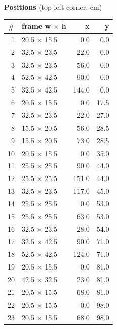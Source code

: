 \documentclass[a4paper,landscape,10pt]{article}
\begin{document}
\begin{minipage}[t]{0.25\textwidth}
\vspace{8pt}
{\bfseries Positions} (top-left corner, cm)\\[2pt]
\tiny
\begin{tabular}{@{}r l r r@{}}
\toprule
\# & frame w $\times$ h & x & y \\
\midrule
1 & 20.5 $\times$ 15.5 & 0.0 & 0.0 \\
2 & 32.5 $\times$ 23.5 & 22.0 & 0.0 \\
3 & 32.5 $\times$ 23.5 & 56.0 & 0.0 \\
4 & 52.5 $\times$ 42.5 & 90.0 & 0.0 \\
5 & 32.5 $\times$ 42.5 & 144.0 & 0.0 \\
6 & 20.5 $\times$ 15.5 & 0.0 & 17.5 \\
7 & 32.5 $\times$ 23.5 & 22.0 & 27.0 \\
8 & 15.5 $\times$ 20.5 & 56.0 & 28.5 \\
9 & 15.5 $\times$ 20.5 & 73.0 & 28.5 \\
10 & 20.5 $\times$ 15.5 & 0.0 & 35.0 \\
11 & 25.5 $\times$ 25.5 & 90.0 & 44.0 \\
12 & 25.5 $\times$ 25.5 & 151.0 & 44.0 \\
13 & 32.5 $\times$ 23.5 & 117.0 & 45.0 \\
14 & 25.5 $\times$ 25.5 & 0.0 & 53.0 \\
15 & 25.5 $\times$ 25.5 & 63.0 & 53.0 \\
16 & 32.5 $\times$ 23.5 & 28.0 & 54.0 \\
17 & 32.5 $\times$ 42.5 & 90.0 & 71.0 \\
18 & 52.5 $\times$ 42.5 & 124.0 & 71.0 \\
19 & 20.5 $\times$ 15.5 & 0.0 & 81.0 \\
20 & 42.5 $\times$ 32.5 & 23.0 & 81.0 \\
21 & 20.5 $\times$ 15.5 & 68.0 & 81.0 \\
22 & 20.5 $\times$ 15.5 & 0.0 & 98.0 \\
23 & 20.5 $\times$ 15.5 & 68.0 & 98.0 \\
\bottomrule
\end{tabular}
\end{minipage}
\clearpage
\end{document}
